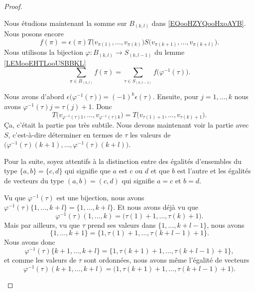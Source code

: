 \begin{proof}
\begin{subproof}
		Nous étudions maintenant la somme sur \( B_{(k,l)}\) dans \eqref{EQooHZYQooHxoAYB}. Nous posons encore
		\begin{equation}
			f(\pi)=\epsilon(\pi)T\big( v_{\pi(1)},\ldots, v_{\pi(k)} \big)S\big( v_{\pi(k+1)},\ldots,v_{\pi(k+l)} \big).
		\end{equation}
		Nous utilisons la bijection \(\varphi \colon B_{(k,l)}\to S_{(k,l-1)}  \) du lemme \ref{LEMooEHTLooUSBBKL}
		\begin{equation}
			\sum_{\pi\in B_{(k,l)}}f(\pi)=\sum_{\tau\in S_{(k,l-1)}}f\big( \varphi^{-1}(\tau) \big).
		\end{equation}

		Nous avons d'abord \( \epsilon\big( \varphi^{-1}(\tau) \big)=(-1)^k\epsilon(\tau)\). Ensuite, pour \( j=1,\ldots,k\) nous avons \( \varphi^{-1}(\tau)j=\tau(j)+1\). Donc
		\begin{equation}		\label{EQooRVUBooGsYfNE}
			T\big( v_{\varphi^{-1}(\tau)1},\ldots,v_{\varphi^{-1}(\tau)k} \big)=T\big( v_{\tau(1)+1},\ldots,v_{\tau(k)+1} \big).
		\end{equation}
		Ça, c'était la partie pas très subtile. Nous devons maintenant voir la partie avec \( S\), c'est-à-dire déterminer en termes de \( \tau\) les valeurs de \( \big( \varphi^{-1}(\tau)(k+1),\ldots,\varphi^{-1}(\tau)(k+l) \big)\).

		Pour la suite, soyez attentifs à la distinction entre des égalités d'ensembles du type \( \{ a,b \}=\{ c,d \}\) qui signifie que \( a\) est \( c\) ou \( d\) et que \( b\) est l'autre et les égalités de vecteurs du type \( (a,b)=(c,d)\) qui signifie \( a=c\) et \( b=d\).

		Vu que \( \varphi^{-1}(\tau)\) est une bijection, nous avons \( \varphi^{-1}(\tau)\{ 1,\ldots,k+l \}=\{ 1,\ldots,k+l \}\). Et nous avons déjà vu que
		\begin{equation}
			\varphi^{-1}(\tau)(1,\ldots,k)=\big( \tau(1)+1,\ldots,\tau(k)+1 \big).
		\end{equation}
		Mais par ailleurs, vu que \( \tau\) prend ses valeurs dans \( \{ 1,\ldots,k+l-1 \}\), nous avons
		\begin{equation}
			\{ 1,\ldots,k+1 \}=\{ 1,\tau(1)+1,\ldots,\tau(k+l-1)+1 \}.
		\end{equation}
		Nous avons donc
		\begin{equation}
			\varphi^{-1}(\tau)\{ k+1,\ldots,k+l \}=\{ 1,\tau(k+1)+1,\ldots,\tau(k+l-1)+1 \},
		\end{equation}
		et comme les valeurs de  \( \tau \) sont ordonnées, nous avons même l'égalité de vecteurs
		\begin{equation}
			\varphi^{-1}(\tau)(k+1,\ldots,k+l)=\big( 1,\tau(k+1)+1,\ldots,\tau(k+l-1)+1 \big).
		\end{equation}


\end{subproof}
\end{proof}
